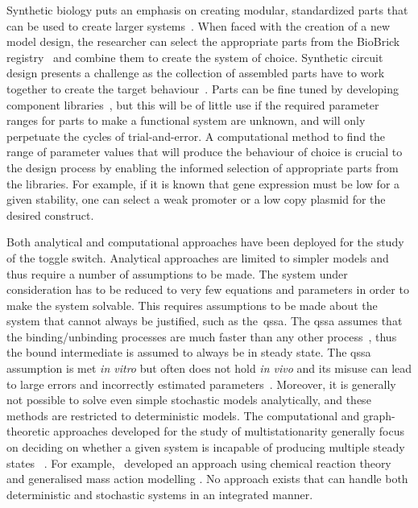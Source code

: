 Synthetic biology puts an emphasis on creating modular, standardized parts that can be used to create larger systems~\autocite{Agapakis:2009bt}. When faced with the creation of a new model design, the researcher can select the appropriate parts from the BioBrick registry~\autocite{Muller:2011bp} and combine them to create the system of choice. Synthetic circuit design presents a challenge as the collection of assembled parts have to work together to create the target behaviour~\autocite{Nielsen:2013hs}. Parts can be fine tuned by developing component libraries~\autocite{Lu:2009ez}, but this will be of little use if the required parameter ranges for parts to make a functional system are unknown, and will only perpetuate the cycles of trial-and-error. A computational method to find the range of parameter values that will produce the behaviour of choice is crucial to the design process by enabling the informed selection of appropriate parts from the libraries. For example, if it is known that gene expression must be low for a given stability, one can select a weak promoter or a low copy plasmid for the desired construct. 

Both analytical and computational approaches have been deployed for the study of the toggle switch. Analytical approaches are limited to simpler models and thus require a number of assumptions to be made. The system under consideration has to be reduced to very few equations and parameters in order to make the system solvable. This requires assumptions to be made about the system that cannot always be justified, such as the~\acrfull{qssa}. The \acrshort{qssa} assumes that the binding/unbinding processes are much faster than any other process~\autocite{Loinger:2007vma}, thus the bound intermediate is assumed to always be in steady state. The \acrshort{qssa} assumption is met \textit{in vitro} but often does not hold \textit{in vivo} and its misuse can lead to large errors and incorrectly estimated parameters~\autocite{Pedersen:2007ke}. Moreover, it is generally not possible to solve even simple stochastic models analytically, and these methods are restricted to deterministic models. The computational and graph-theoretic approaches developed for the study of multistationarity generally focus on deciding on whether a given system is incapable of producing multiple steady states ~\autocite{Conradi:2007jo, Banaji:2010fh,Feliu:2013dz}. For example,~\textcite{Feliu:2013dz} developed an approach using chemical reaction theory and generalised mass action modelling \autocite{Feliu:2013dz}. No approach exists that can handle both deterministic and stochastic systems in an integrated manner.

